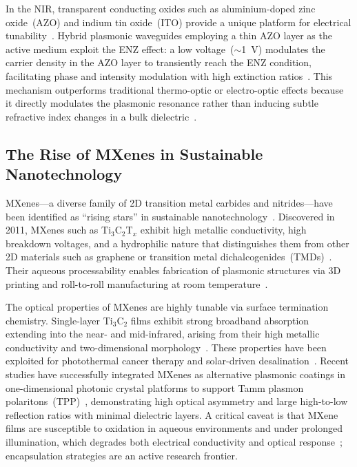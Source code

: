 \documentclass[twocolumn,10pt]{article}
\begin{document}
In the NIR, transparent conducting oxides such as aluminium-doped zinc
oxide~(AZO) and indium tin oxide~(ITO) provide a unique platform for
electrical tunability~\cite{alam2016large,feigenbaum2010unity}.  Hybrid
plasmonic waveguides employing a thin AZO layer as the active medium
exploit the ENZ effect: a low voltage~($\sim$1~V) modulates the carrier
density in the AZO layer to transiently reach the ENZ condition,
facilitating phase and intensity modulation with high extinction
ratios~\cite{feigenbaum2010unity}.  This mechanism outperforms
traditional thermo-optic or electro-optic effects because it directly
modulates the plasmonic resonance rather than inducing subtle refractive
index changes in a bulk dielectric~\cite{alam2016large}.

\subsection{The Rise of MXenes in Sustainable Nanotechnology}

MXenes---a diverse family of 2D transition metal carbides and
nitrides---have been identified as ``rising stars'' in sustainable
nanotechnology~\cite{gogotsi2019rise}.  Discovered in 2011, MXenes such
as Ti$_3$C$_2$T$_x$ exhibit high metallic conductivity, high breakdown
voltages, and a hydrophilic nature that distinguishes them from other 2D
materials such as graphene or transition metal
dichalcogenides~(TMDs)~\cite{naguib2014mxene,anasori2017mxenes}.  Their
aqueous processability enables fabrication of plasmonic structures via
3D printing and roll-to-roll manufacturing at room
temperature~\cite{gogotsi2019rise,anasori2017mxenes}.

The optical properties of MXenes are highly tunable via surface
termination chemistry.  Single-layer Ti$_3$C$_2$ films exhibit strong
broadband absorption extending into the near- and mid-infrared, arising
from their high metallic conductivity and two-dimensional
morphology~\cite{anasori2017mxenes,naguib2014mxene}.  These properties
have been exploited for photothermal cancer therapy and solar-driven
desalination~\cite{gogotsi2019rise}.  Recent studies have
successfully integrated MXenes as alternative plasmonic coatings in
one-dimensional photonic crystal platforms to support Tamm plasmon
polaritons~(TPP)~\cite{kaliteevski2007tamm}, demonstrating high optical
asymmetry and large high-to-low reflection ratios with minimal dielectric
layers.  A critical caveat is that MXene films are susceptible to
oxidation in aqueous environments and under prolonged illumination,
which degrades both electrical conductivity and optical
response~\cite{gogotsi2019rise}; encapsulation strategies are an active
research frontier.
\end{document}
